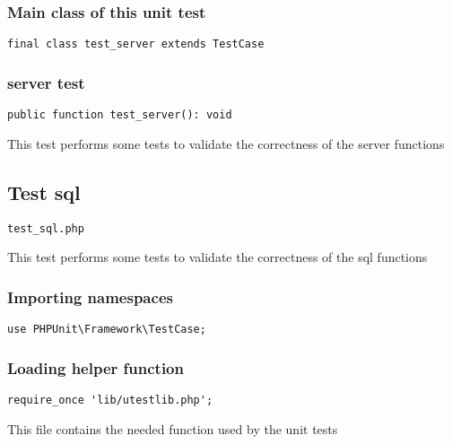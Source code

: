 \documentclass[a4paper]{article}
\begin{document}
\hypertarget{toc331}{}
\subsubsection{Main class of this unit test}

\begin{lstlisting}
final class test_server extends TestCase
\end{lstlisting}

\hypertarget{toc332}{}
\subsubsection{server test}

\begin{lstlisting}
public function test_server(): void
\end{lstlisting}

This test performs some tests to validate the correctness
of the server functions

\hypertarget{toc333}{}
\subsection{Test sql}

\begin{lstlisting}
test_sql.php
\end{lstlisting}

This test performs some tests to validate the correctness
of the sql functions

\hypertarget{toc334}{}
\subsubsection{Importing namespaces}

\begin{lstlisting}
use PHPUnit\Framework\TestCase;
\end{lstlisting}

\hypertarget{toc335}{}
\subsubsection{Loading helper function}

\begin{lstlisting}
require_once 'lib/utestlib.php';
\end{lstlisting}

This file contains the needed function used by the unit tests

\hypertarget{toc336}{}
\end{document}
